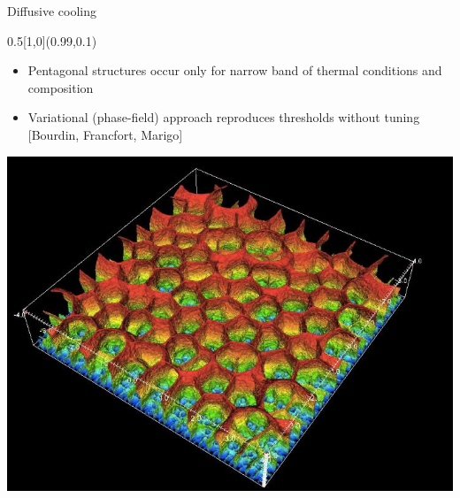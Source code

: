 {
%
\begin{frame}{Diffusive cooling}
  \begin{textblock}{0.5}[1,0](0.99,0.1)
    \begin{itemize} \color{white} \small
    \item Pentagonal structures occur only for narrow band of thermal conditions and composition
    \item Variational (phase-field) approach reproduces thresholds without tuning [Bourdin, Francfort, Marigo]
    \end{itemize}
    \includegraphics[width=\textwidth]{figures/BlaiseCoolingFrame.jpg}
  \end{textblock}
\end{frame}
}
